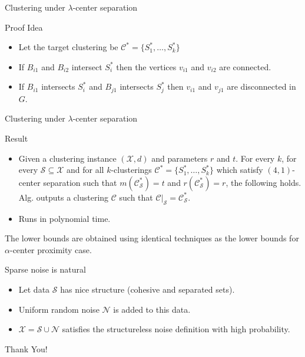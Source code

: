 \documentclass{beamer}
\newcommand{\mc}{\mathcal}
\begin{document}
\begin{frame}{Clustering under $\lambda$-center separation}
	\begin{block}{Proof Idea}
	\begin{itemize}
	  \item Let the target clustering be $\mc C^* = \{S_1^*, \ldots, S_k^*\}$
	  \item If $B_{i1}$ and $B_{i2}$ intersect $S_i^*$ then the vertices $v_{i1}$ and $v_{i2}$ are connected.
	  \item If $B_{i1}$ intersects $S_i^*$ and $B_{j1}$ intersects $S_j^*$ then $v_{i1}$ and $v_{j1}$ are disconnected in $G$.	
    \end{itemize} 	
	\end{block}
\end{frame}

\begin{frame}{Clustering under $\lambda$-center separation}
	\begin{block}{Result}
	\begin{itemize}
	  \item Given a clustering instance $(\mc X, d)$ and parameters $r$ and $t$. For every $k$, for every $\mc S \subseteq \mc X$ and for all $k$-clusterings $\mc C^* = \{S_1^*, \ldots, S_k^*\}$ which satisfy $(4, 1)$-center separation such that $ m(\mc C_{\mc S}^*) = t$ and $r(\mc C_{\mc S}^*) = r$, the following holds. Alg. outputs a clustering $\mc C$ such that $\mc C|_{\mc S} = \mc C_{\mc S}^*$.
	  \item Runs in polynomial time.
	\end{itemize}
	\end{block}
	The lower bounds are obtained using identical techniques as the lower bounds for $\alpha$-center proximity case.
\end{frame}

\begin{frame}{Sparse noise is natural}
    \begin{itemize}
	  \item Let data $\mc S$ has nice structure (cohesive and separated sets).
	  \item Uniform random noise $\mc N$ is added to this data.
	  \item $\mc X = \mc S \cup \mc N$ satisfies the structureless noise definition with high probability.
    \end{itemize}
\end{frame}

\begin{frame}
    \Huge{\centerline{Thank You!}}
\end{frame}
\end{document}

